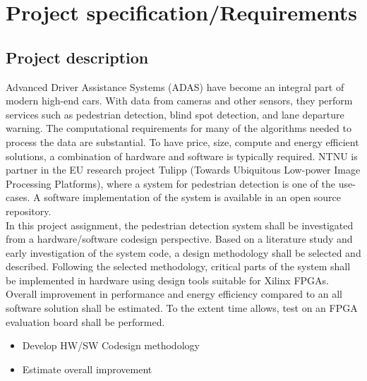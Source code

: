 \section{Project specification/Requirements}

\subsection{Project description}
Advanced Driver Assistance Systems (ADAS) have become an integral part of modern high-end cars. With data from cameras and other sensors, they perform services such as pedestrian detection, blind spot detection, and lane departure warning. The computational requirements for many of the algorithms needed to process the data are substantial. To have price, size, compute and energy efficient solutions, a combination of hardware and software is typically required.  NTNU is partner in the EU research project Tulipp (Towards Ubiquitous Low-power Image Processing Platforms), where a system for pedestrian detection is one of the use-cases. A software implementation of the system is available in an open source repository.\\

\noindent
In this project assignment, the pedestrian detection system shall be investigated from a hardware/software codesign perspective. Based on a literature study and early investigation of the system code, a design methodology shall be selected and described. Following the selected methodology, critical parts of the system shall be implemented in hardware using design tools suitable for Xilinx FPGAs. Overall improvement in performance and energy efficiency compared to an all software solution shall be estimated. To the extent time allows, test on an FPGA evaluation board shall be performed. \\

\begin{itemize}
    \item Develop HW/SW Codesign methodology
    \item Estimate overall improvement
\end{itemize}